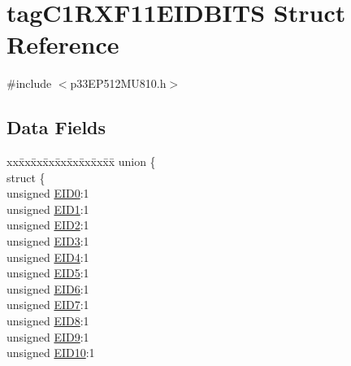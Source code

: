 \hypertarget{structtag_c1_r_x_f11_e_i_d_b_i_t_s}{}\section{tag\+C1\+R\+X\+F11\+E\+I\+D\+B\+I\+TS Struct Reference}
\label{structtag_c1_r_x_f11_e_i_d_b_i_t_s}


{\ttfamily \#include $<$p33\+E\+P512\+M\+U810.\+h$>$}

\subsection*{Data Fields}
\begin{DoxyCompactItemize}
\item 
\begin{tabbing}
xx\=xx\=xx\=xx\=xx\=xx\=xx\=xx\=xx\=\kill
union \{\\
\>struct \{\\
\>\>unsigned \hyperlink{structtag_c1_r_x_f11_e_i_d_b_i_t_s_a9da8b7b30247e4f9cd8cc056549aa9fd}{EID0}:1\\
\>\>unsigned \hyperlink{structtag_c1_r_x_f11_e_i_d_b_i_t_s_afd6c139491d147c1262f3d051c6691e9}{EID1}:1\\
\>\>unsigned \hyperlink{structtag_c1_r_x_f11_e_i_d_b_i_t_s_a36ec62d8d3c5acd5d15e6691dc099a94}{EID2}:1\\
\>\>unsigned \hyperlink{structtag_c1_r_x_f11_e_i_d_b_i_t_s_ab895f7d0ac289a0383b607cbc62eebe2}{EID3}:1\\
\>\>unsigned \hyperlink{structtag_c1_r_x_f11_e_i_d_b_i_t_s_a136d5a709d6618d40acceccb43036656}{EID4}:1\\
\>\>unsigned \hyperlink{structtag_c1_r_x_f11_e_i_d_b_i_t_s_a8dffb2d86a6c184df505ae7c71a58710}{EID5}:1\\
\>\>unsigned \hyperlink{structtag_c1_r_x_f11_e_i_d_b_i_t_s_af8a8574102515d8f1a4b7fd1685d0532}{EID6}:1\\
\>\>unsigned \hyperlink{structtag_c1_r_x_f11_e_i_d_b_i_t_s_a84c3262e67f8d5fd387ac10bde6fa9b1}{EID7}:1\\
\>\>unsigned \hyperlink{structtag_c1_r_x_f11_e_i_d_b_i_t_s_acca25e0b7d86eb499d01f85222baea87}{EID8}:1\\
\>\>unsigned \hyperlink{structtag_c1_r_x_f11_e_i_d_b_i_t_s_ac6748f73d4ada8538b06548be4f396c2}{EID9}:1\\
\>\>unsigned \hyperlink{structtag_c1_r_x_f11_e_i_d_b_i_t_s_a9cea8e77ecbb72bd3b08102412793725}{EID10}:1\\

\end{tabbing}
\end{DoxyCompactItemize}
